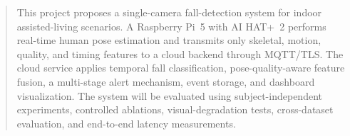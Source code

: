 \begin{abstract}
This project proposes a single-camera fall-detection system for indoor assisted-living scenarios. A Raspberry Pi~5 with AI HAT+~2 performs real-time human pose estimation and transmits only skeletal, motion, quality, and timing features to a cloud backend through MQTT/TLS. The cloud service applies temporal fall classification, pose-quality-aware feature fusion, a multi-stage alert mechanism, event storage, and dashboard visualization. The system will be evaluated using subject-independent experiments, controlled ablations, visual-degradation tests, cross-dataset evaluation, and end-to-end latency measurements.
\end{abstract}
